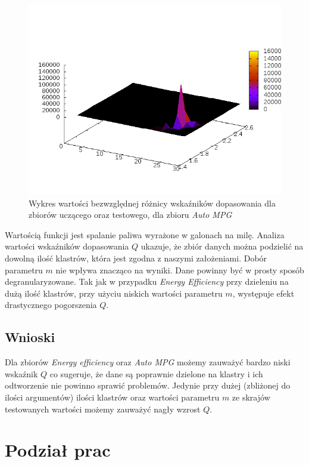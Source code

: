 \documentclass[a4paper; 11pt]{article}
\begin{document}
\begin{figure}[h]
\begin{center}
\includegraphics[scale=0.7]{dq_mpg.png}
\caption{Wykres wartości bezwzględnej różnicy wskaźników dopasowania dla zbiorów uczącego oraz testowego, dla zbioru \emph{Auto MPG}}
\end{center}
\end{figure}

Wartością funkcji jest spalanie paliwa wyrażone w galonach na milę. Analiza wartości wskaźników dopasowania
$Q$ ukazuje, że zbiór danych można podzielić na dowolną ilość klastrów, która jest zgodna z naszymi
założeniami. Dobór parametru $m$ nie wpływa znacząco na wyniki. Dane powinny być w prosty sposób
degranularyzowane. Tak jak w przypadku \emph{Energy Efficiency} przy dzieleniu na dużą ilość klastrów,
przy użyciu niskich wartości parametru $m$, występuje efekt drastycznego pogorszenia $Q$.

\subsection{Wnioski}
Dla zbiorów \emph{Energy efficiency} oraz \emph{Auto MPG} możemy zauważyć bardzo niski wskaźnik $Q$ co sugeruje,
że dane są poprawnie dzielone na klastry i ich odtworzenie nie powinno sprawić problemów. Jedynie przy dużej
(zbliżonej do ilości argumentów) ilości klastrów oraz wartości parametru $m$ ze skrajów testowanych wartości
możemy zauważyć nagły wzrost $Q$.

\section{Podział prac}
\end{document}
